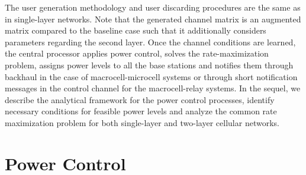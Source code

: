 \documentclass[conference,letterpaper,final,10pt]{IEEEtran}
\begin{document}
The user generation methodology and user discarding procedures are the same as in single-layer networks. Note that the generated channel matrix is an augmented matrix compared to the baseline case such that it additionally considers parameters regarding the second layer. Once the channel conditions are learned, the central processor applies power control, solves the rate-maximization problem, assigns power levels to all the base stations and notifies them through backhaul in the case of macrocell-microcell systems or through short notification messages in the control channel for the macrocell-relay systems. In the sequel, we describe the analytical framework for the power control processes, identify necessary conditions for feasible power levels and analyze the common rate maximization problem for both single-layer and two-layer cellular networks.

\section{Power Control}\label{PowerControlSection}
\end{document}
